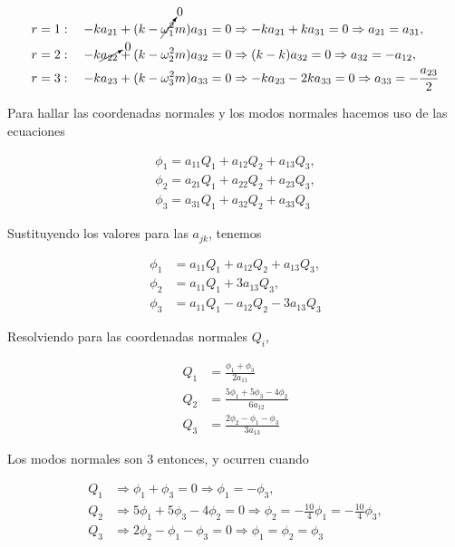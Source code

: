 \documentclass[a4paper,10pt]{article}
\numberwithin{equation}{section}
\begin{document}
\begin{align}
 r &= 1: \quad -ka_{21} + (k - \cancelto{0}{\omega_1^2}m)a_{31} = 0 \Rightarrow
 -ka_{21} + ka_{31} = 0 \Rightarrow a_{21} = a_{31}, \\
 r &= 2: \quad -k\cancelto{0}{a_{22}} + (k - \omega_2^2m)a_{32} = 0 \Rightarrow
 (k - k)a_{32} = 0 \Rightarrow a_{32} = - a_{12}, \\
 r &= 3: \quad -ka_{23} + (k - \omega_3^2m)a_{33} = 0 \Rightarrow
 -ka_{23} - 2ka_{33} = 0 \Rightarrow a_{33} = - \frac{a_{23}}{2}
\end{align}

Para hallar las coordenadas normales y los modos normales hacemos uso de las ecuaciones 
\cite{marion}

\begin{align}
 \phi_1 = a_{11}Q_1 + a_{12}Q_2 + a_{13}Q_3, \\
 \phi_2 = a_{21}Q_1 + a_{22}Q_2 + a_{23}Q_3, \\
 \phi_3 = a_{31}Q_1 + a_{32}Q_2 + a_{33}Q_3
\end{align}

Sustituyendo los valores para las $a_{jk}$, tenemos 

\begin{align}
 \phi_1 &= a_{11}Q_1 + a_{12}Q_2 + a_{13}Q_3, \\
 \phi_2 &= a_{11}Q_1 + 3a_{13}Q_3, \\
 \phi_3 &= a_{11}Q_1 - a_{12}Q_2 - 3a_{13}Q_3
\end{align}

Resolviendo para las coordenadas normales $Q_i$, 

\begin{align}
 Q_1 &= \frac{\phi_1 + \phi_3}{2a_{11}}\\
 Q_2 &= \frac{5\phi_1 + 5\phi_3 - 4\phi_2}{6a_{12}}\\
 Q_3 &= \frac{2\phi_2 - \phi_1 - \phi_3}{3a_{13}}
\end{align}

Los modos normales son 3 entonces, y ocurren cuando 

\begin{align}
 Q_1 &\Rightarrow \phi_1 + \phi_3 = 0 \Rightarrow \phi_1 = -\phi_3, \\
 Q_2 &\Rightarrow 5\phi_1 + 5\phi_3 - 4\phi_2 = 0 \Rightarrow \phi_2 = 
 - \frac{10}{4} \phi_1 = - \frac{10}{4} \phi_3, \\
 Q_3 &\Rightarrow 2\phi_2 - \phi_1 - \phi_3 = 0 \Rightarrow 
 \phi_1 = \phi_2 = \phi_3
\end{align}
\end{document}
